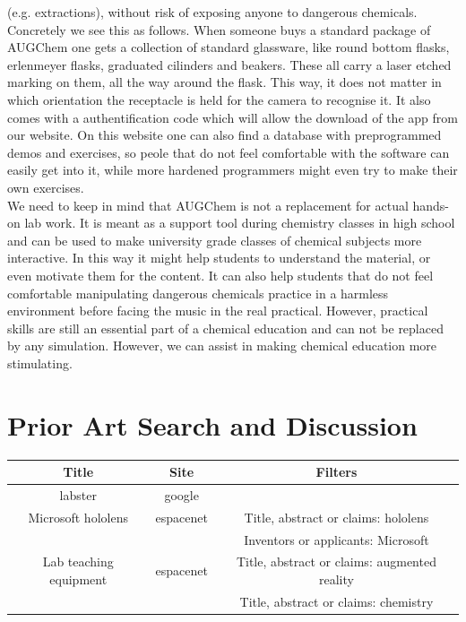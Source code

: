 \documentclass[%
    paper=A4,               %
    twoside=true,           %
    openany,              %
    parskip=full,           %
    chapterprefix=true,     %
    11pt,                   %
    headings=normal,        %
    bibliography=totoc,     %
    listof=totoc,           %
    titlepage=on,           %
    captions=tableabove,    %
    draft=false,            %
]{scrreprt}
\numberwithin{equation}{section}
\begin{document}
    (e.g. extractions), without risk of exposing anyone to dangerous chemicals. \\
    Concretely we see this as follows. When someone buys a standard package of AUGChem one gets a collection of standard glassware, like round bottom flasks, erlenmeyer flasks,
    graduated cilinders and beakers. These all carry a laser etched marking on them, all the way around the flask. This way, it does not matter in which orientation the receptacle
    is held for the camera to recognise it. It also comes with a authentification code which will allow the download of the app from our website. On this website one can also find
    a database with preprogrammed demos and exercises, so peole that do not feel comfortable with the software can easily get into it, while more hardened programmers might even
    try to make their own exercises. \\
    We need to keep in mind that AUGChem is not a replacement for actual hands-on lab work. It is meant as a support tool during chemistry classes in high school and can be used to
    make university grade classes of chemical subjects more interactive. In this way it might help students to understand the material, or even motivate them for the content.
    It can also help students that do not feel comfortable manipulating dangerous chemicals practice in a harmless environment before facing the music in the real practical. 
    However, practical skills are still an essential part of a chemical education and can not be replaced by any simulation. However, we can assist in making chemical education more 
    stimulating. 


    \section{Prior Art Search and Discussion}
    \label{sec:priorart}

        \begin{table}[h!]
            \begin{tabular}{|c|c|c|}
                \hline
                \textbf{Title} & \textbf{Site} & \textbf{Filters} \\
                \hline
                labster & google &  \\
                Microsoft hololens & espacenet & Title, abstract or claims: hololens \\
                & & Inventors or applicants: Microsoft \\
                Lab teaching equipment & espacenet & Title, abstract or claims: augmented reality \\
                 & & Title, abstract or claims: chemistry \\
                \hline
            \end{tabular}
        \end{table}
\end{document}
